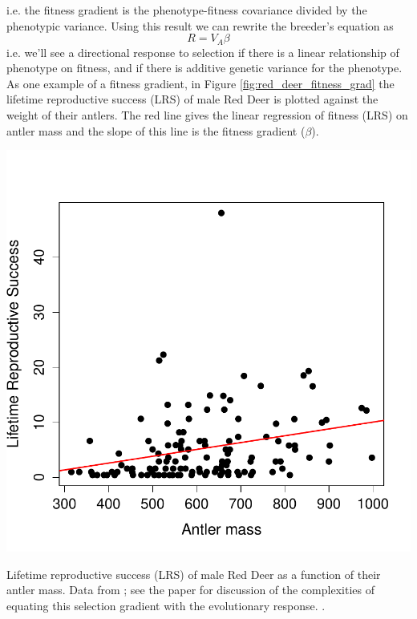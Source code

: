   i.e. the fitness gradient is the phenotype-fitness
 covariance divided by the phenotypic variance. Using this result we can rewrite the breeder's equation as
\begin{equation}
R= V_A \beta \label{eqn:R_beta}
\end{equation}
i.e. we'll see a directional response to selection if there is a linear relationship of phenotype on fitness, and if there is additive genetic variance for the phenotype. As one example of a fitness gradient, in Figure \ref{fig:red_deer_fitness_grad}  the lifetime reproductive success (LRS) of male Red Deer is plotted against the weight of their antlers. The red line gives the linear regression of fitness (LRS) on antler mass and the slope of this line is the fitness gradient ($\beta$). 
\begin{marginfigure}[2cm]
\begin{center}
\includegraphics[width= \textwidth]{Journal_figs/Quant_gen/red_deer_selection_gradient/selection_grad_deer.pdf}
\end{center}
\caption{Lifetime reproductive success (LRS) of male Red Deer as a
  function of their antler mass. Data from \citet{kruuk2002antler};
  see the paper for discussion of the complexities of equating this
  selection gradient with the evolutionary response. . } \label{fig:red_deer_fitness_grad}  
\end{marginfigure}

